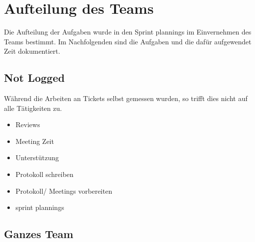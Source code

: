 \newcommand{\trWork}[6]
{
    \multicolumn{1}{|l|}{\textbf{\begin{tabular}[c]{@{}l@{}}#1\end{tabular}}} &
    \multicolumn{1}{l|}{#2} &
    \multicolumn{1}{l|}{#3} &
    \\ \cline{1-3}
    \begin{tabular}[c]{@{}l@{}}#4\end{tabular} &
    \multicolumn{2}{l}{\begin{tabular}[c]{@{}l@{}}#5\end{tabular}} &
    \multirow{\begin{tabular}[c]{@{}l@{}}#6\end{tabular}} \\ \hline
}
\newcommand{\gitIssue}[1]
{
    \href{https://github.com/MaxTrautwein/AStA-Digital-Forms/issues/#1}{Issue #1}
}
\newcommand{\gitPull}[1]
{
    \href{https://github.com/MaxTrautwein/AStA-Digital-Forms/pull/#1}{PR #1}
}
\newcommand{\gitCommit}[2]
{
    \href{https://github.com/MaxTrautwein/AStA-Digital-Forms/pull/#1/commits/#2}{\StrLeft{#2}{10}}
}

\chapter{Aufteilung des Teams}\label{ch:aufteilung-des-teams}
Die Aufteilung der Aufgaben wurde in den Sprint plannings im Einvernehmen des Teams bestimmt.
Im Nachfolgenden sind die Aufgaben und die dafür aufgewendet Zeit dokumentiert.

\section{Not Logged}
Während die Arbeiten an Tickets selbst gemessen wurden, so trifft dies nicht auf alle Tätigkeiten zu.

\begin{itemize}
    \item Reviews
    \item Meeting Zeit
    \item Unterstützung
    \item Protokoll schreiben
    \item Protokoll/ Meetings vorbereiten
    \item sprint plannings
\end{itemize}

\section{Ganzes Team}

